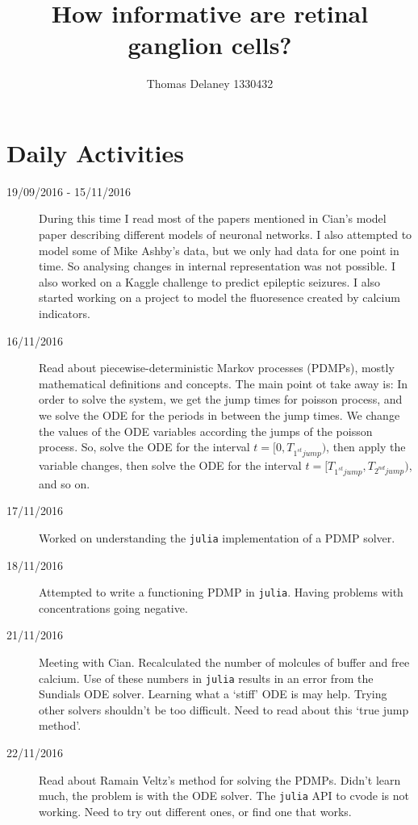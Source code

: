 \documentclass[a4paper,12pt]{article}
\title{How informative are retinal ganglion cells?}
\author{Thomas Delaney 1330432}
\theoremstyle{definition}
\begin{document}
	\section*{Daily Activities}

	\begin{description}
	\item[19/09/2016 - 15/11/2016] During this time I read most of the papers mentioned in Cian's model paper describing different models of neuronal networks. I also attempted to model some of Mike Ashby's data, but we only had data for one point in time. So analysing changes in internal representation was not possible. I also worked on a Kaggle challenge to predict epileptic seizures. I also started working on a project to model the fluoresence created by calcium indicators.

	\item[16/11/2016] Read about piecewise-deterministic Markov processes (PDMPs), mostly mathematical definitions and concepts. The main point ot take away is: In order to solve the system, we get the jump times for poisson process, and we solve the ODE for the periods in between the jump times. We change the values of the ODE variables according the jumps of the poisson process. So, solve the ODE for the interval $t = [0, T_{1^{st} jump})$, then apply the variable changes, then solve the ODE for the interval $t = [T_{1^{st} jump}, T_{2^{nd} jump})$, and so on.

	\item[17/11/2016] Worked on understanding the \texttt{julia} implementation of a PDMP solver.

	\item[18/11/2016] Attempted to write a functioning PDMP in \texttt{julia}. Having problems with concentrations going negative.

	\item[21/11/2016] Meeting with Cian. Recalculated the number of molcules of buffer and free calcium. Use of these numbers in \texttt{julia} results in an error from the Sundials ODE solver. Learning what a `stiff' ODE is may help. Trying other solvers shouldn't be too difficult. Need to read about this `true jump method'.

	\item[22/11/2016] Read about Ramain Veltz's method for solving the PDMPs. Didn't learn much, the problem is with the ODE solver. The \texttt{julia} API to cvode is not working. Need to try out different ones, or find one that works.


\end{description}
\end{document}
